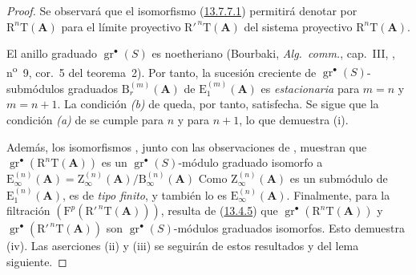 \begin{proof}
Se observará que el isomorfismo (\hyperref[0.13.7.7.1-fr]{13.7.7.1}) permitirá denotar por $\mathrm R^n\mathrm T(\mathbf A)$ para el límite proyectivo
$\mathrm R'^{\,n}\mathrm T(\mathbf A)$ del sistema proyectivo
$\mathrm R^n\mathrm T(\mathbf A)$.

El anillo graduado $\operatorname{gr}^\bullet(S)$ es noetheriano
(Bourbaki, \emph{Alg.\ comm.}, cap.~III, ,
n\textsuperscript{o}~9, cor.~5 del teorema~2).
Por tanto, la sucesión creciente de
$\operatorname{gr}^\bullet(S)$-submódulos graduados
$\mathrm B_r^{(m)}(\mathbf A)$ de
$\mathrm E_1^{(m)}(\mathbf A)$ es \emph{estacionaria} para $m=n$ y
$m=n+1$.
La condición \emph{(b)} de  queda, por tanto, satisfecha.
Se sigue que la condición \emph{(a)} de  se cumple para
$n$ y para $n+1$, lo que demuestra {\rm(i)}.

Además, los isomorfismos , junto con las
observaciones de , muestran que
$\operatorname{gr}^\bullet(\mathrm R^n\mathrm T(\mathbf A))$ es un
$\operatorname{gr}^\bullet(S)$-módulo graduado isomorfo a
$\mathrm E_\infty^{(n)}(\mathbf A)=
\mathrm Z_\infty^{(n)}(\mathbf A)/\mathrm B_\infty^{(n)}(\mathbf A)$
Como $\mathrm Z_\infty^{(n)}(\mathbf A)$ es un submódulo de
$\mathrm E_1^{(n)}(\mathbf A)$, es de \emph{tipo finito}, y también lo es
$\mathrm E_\infty^{(n)}(\mathbf A)$.
Finalmente, para la filtración
$(\mathrm F^p(\mathrm R'^{\,n}\mathrm T(\mathbf A)))$, resulta de (\hyperref[0.13.4.5-fr]{13.4.5}) que $\operatorname{gr}^\bullet(\mathrm R^n\mathrm T(\mathbf A))$ y $\operatorname{gr}^\bullet(\mathrm R'^{\,n}\mathrm T(\mathbf A))$ son $\operatorname{gr}^\bullet(S)$-módulos graduados isomorfos.
Esto demuestra {\rm(iv)}.
Las aserciones {\rm(ii)} y {\rm(iii)} se seguirán de estos resultados
y del lema siguiente.
\end{proof}

